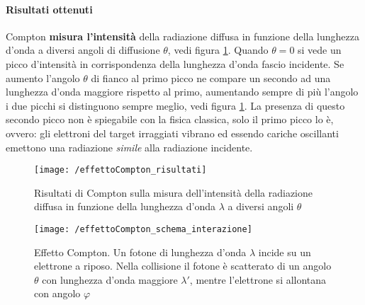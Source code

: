 \paragraph{Risultati ottenuti}
Compton \textbf{misura l'intensità} della radiazione diffusa in funzione della lunghezza d'onda a diversi angoli di diffusione $\theta$, vedi figura \ref{compton_results}.
Quando $\theta = 0$ si vede un picco d'intensità in corrispondenza della lunghezza d'onda fascio incidente.
Se aumento l'angolo $\theta$ di fianco al primo picco ne compare un secondo ad una lunghezza d'onda maggiore rispetto al primo, aumentando sempre di più l'angolo i due picchi si distinguono sempre meglio, vedi figura \ref{compton_results}.
La presenza di questo secondo picco non è spiegabile con la fisica classica, solo il primo picco lo è, ovvero:
gli elettroni del target irraggiati vibrano ed essendo cariche oscillanti emettono una radiazione \textit{simile} alla radiazione incidente.
\begin{figure}[h]
\centering
\texttt{[image: /effettoCompton\_risultati]}
\caption{Risultati di Compton sulla misura dell'intensità della radiazione diffusa in funzione della lunghezza d'onda $\lambda$ a diversi angoli $\theta$}
\label{compton_results}
\end{figure}
\begin{figure}[h]
\centering
\texttt{[image: /effettoCompton\_schema\_interazione]}
\caption{ Effetto Compton. Un fotone di lunghezza d'onda $\lambda$ incide su un elettrone a riposo. 
Nella collisione il fotone è scatterato di un angolo $\theta$ con lunghezza d'onda maggiore $\lambda '$, 
mentre l'elettrone si allontana con angolo $\varphi$ }
\label{plot_risultati}
\end{figure}


